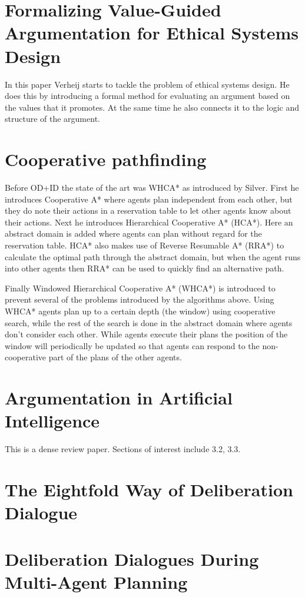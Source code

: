 \documentclass[a4paper]{article}
\begin{document}
\section{Formalizing Value-Guided Argumentation for Ethical Systems 
Design\cite{verheij2016}}
In this paper Verheij starts to tackle the problem of ethical systems design. 
He does this by introducing a formal method for evaluating an argument based on 
the values that it promotes. At the same time he also connects it to the logic 
and structure of the argument.

\section{Cooperative pathfinding\cite{silver2005}}
Before OD+ID the state of the art was WHCA* as introduced by Silver. First he 
introduces Cooperative A* where agents plan independent from each other, but 
they do note their actions in a reservation table to let other agents know 
about their actions. Next he introduces Hierarchical Cooperative A* (HCA*). 
Here an abstract domain is added where agents can plan without regard for the 
reservation table. HCA* also makes use of Reverse Resumable A* (RRA*) to 
calculate the optimal path through the abstract domain, but when the agent runs 
into other agents then RRA* can be used to quickly find an alternative path. 

Finally Windowed Hierarchical Cooperative A* (WHCA*) is introduced to prevent 
several of the problems introduced by the algorithms above. Using WHCA* agents 
plan up to a certain depth (the window) using cooperative search, while the 
rest of the search is done in the abstract domain where agents don't consider 
each other. While agents execute their plans the position of the window will 
periodically be updated so that agents can respond to the non-cooperative part 
of the plans of the other agents.

\section{Argumentation in Artificial Intelligence \cite{bench-capon2007}}
This is a dense review paper. Sections of interest include 3.2, 3.3.

\section{The Eightfold Way of Deliberation Dialogue\cite{mcburney2007}}

\section{Deliberation Dialogues During Multi-Agent Planning\cite{dunin-keplicz2011}}

\nocite{*}


\end{document}
